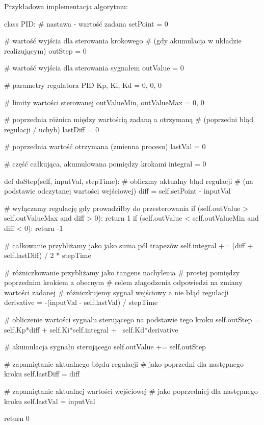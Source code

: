 \documentclass{pdfBooklets}
\begin{document}
Przykładowa implementacja algorytmu:
\begin{CodeFrame*}[python]{}
class PID:
  # nastawa - wartość zadana
  setPoint = 0
  
  # wartość wyjścia dla sterowania krokowego
  # (gdy akumulacja w układzie realizującym)
  outStep = 0
  
  # wartość wyjścia dla sterowania sygnałem
  outValue = 0
  
  # parametry regulatora PID
  Kp, Ki, Kd = 0, 0, 0
  
  # limity wartości sterowanej
  outValueMin, outValueMax = 0, 0
  
  # poprzednia różnica między wartością zadaną a otrzymaną
  # (poprzedni błąd regulacji / uchyb)
  lastDiff = 0
  
  # poprzednia wartość otrzymana (zmienna procesu)
  lastVal = 0
  
  # część całkująca, akumulowana pomiędzy krokami
  integral = 0
  
  def doStep(self, inputVal, stepTime):
    # obliczmy aktualny błąd regulacji
    # (na podstawie odczytanej wartości wejściowej)
    diff = self.setPoint - inputVal
    
    # wyłączamy regulację gdy prowadziłby do przesterowania
    if (self.outValue > self.outValueMax and diff > 0):
      return 1
    if (self.outValue < self.outValueMin and diff < 0):
      return -1
    
    # całkowanie przybliżamy jako jako suma pól trapezów
    self.integral += (diff + self.lastDiff) / 2 * stepTime
    
    # różniczkowanie przybliżamy jako tangens nachylenia
    # prostej pomiędzy poprzednim krokiem a obecnym
    # celem złagodzenia odpowiedzi na zmiany wartości zadanej
    # różniczkujemy sygnał wejściowy a nie błąd regulacji
    derivative = -(inputVal - self.lastVal) / stepTime
    
    # obliczenie wartości sygnału sterującego na podstawie tego kroku
    self.outStep   = self.Kp*diff + self.Ki*self.integral + \
                     self.Kd*derivative
    
    # akumulacja sygnału sterującego
    self.outValue += self.outStep
    
    # zapamiętanie aktualnego błędu regulacji
    # jako poprzedni dla następnego kroku
    self.lastDiff = diff
    
    # zapamiętanie aktualnej wartości wejściowej
    # jako poprzedniej dla następnego kroku
    self.lastVal  = inputVal
    
    return 0
\end{CodeFrame*}
\end{document}
